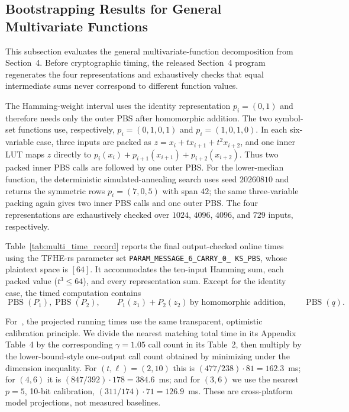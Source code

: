 \subsection{Bootstrapping Results for General Multivariate Functions}

This subsection evaluates the general multivariate-function decomposition from
Section~4. Before cryptographic timing, the released Section~4 program
regenerates the four representations and exhaustively checks that equal
intermediate sums never correspond to different function values.

The Hamming-weight interval uses the identity representation $p_i=(0,1)$ and
therefore needs only the outer PBS after homomorphic addition. The two
symbol-set functions use, respectively, $p_i=(0,1,0,1)$ and
$p_i=(1,0,1,0)$. In each six-variable case, three inputs are packed as
$z=x_i+t x_{i+1}+t^2x_{i+2}$, and one inner LUT maps $z$ directly to
$p_i(x_i)+p_{i+1}(x_{i+1})+p_{i+2}(x_{i+2})$. Thus two packed inner PBS calls
are followed by one outer PBS. For the lower-median function, the deterministic
simulated-annealing search uses seed $20260810$ and returns the symmetric rows
$p_i=(7,0,5)$ with span $42$; the same three-variable packing again gives two
inner PBS calls and one outer PBS. The four representations are exhaustively
checked over $1024$, $4096$, $4096$, and $729$ inputs, respectively.

Table~\ref{tab:multi_time_record} reports the final output-checked online times
using the TFHE-rs parameter set
\texttt{PARAM\_\allowbreak MESSAGE\_6\_\allowbreak CARRY\_0\_\allowbreak
KS\_\allowbreak PBS}, whose plaintext space is
$[64]$. It accommodates the ten-input Hamming sum, each packed value
($t^3\leq64$), and every representation sum. Except for the identity case, the
timed computation contains
\[
\operatorname{PBS}(P_1),\operatorname{PBS}(P_2),
\qquad
P_1(z_1)+P_2(z_2)\ \text{by homomorphic addition},
\qquad
\operatorname{PBS}(q).
\]

For~\cite{BBR26}, the projected running times use the same transparent,
optimistic calibration principle. We divide the nearest matching total time in
its Appendix Table~4 by the corresponding $\gamma=1.05$ call count in its
Table~2, then multiply by the lower-bound-style one-output call count obtained
by minimizing under the dimension inequality. For $(t,\ell)=(2,10)$ this is
$(477/238)\cdot81=162.3$~ms; for $(4,6)$ it is
$(847/392)\cdot178=384.6$~ms; and for $(3,6)$ we use the nearest $p=5$, 10-bit
calibration, $(311/174)\cdot71=126.9$~ms. These are cross-platform model
projections, not measured baselines.


